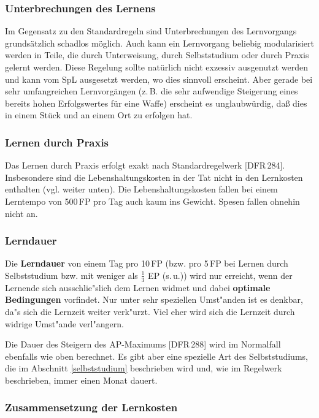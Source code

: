 \documentclass[10pt,a4paper,germanpar]{article}
\begin{document}
\subsubsection{Unterbrechungen des Lernens}

Im Gegensatz zu den Standardregeln sind Unterbrechungen des
Lernvorgangs grundsätzlich schadlos möglich. Auch kann ein Lernvorgang
beliebig modularisiert werden in Teile, die durch Unterweisung, durch
Selbststudium oder durch Praxis gelernt werden. Diese Regelung sollte
natürlich nicht exzessiv ausgenutzt werden und kann vom SpL
ausgesetzt werden, wo dies sinnvoll erscheint.  Aber gerade bei sehr
umfangreichen Lernvorgängen (z.\,B. die sehr aufwendige Steigerung
eines bereits hohen Erfolgswertes für eine Waffe) erscheint es
un\-glaub\-wür\-dig, daß dies in einem Stück und an einem Ort zu erfolgen
hat.

\subsubsection{Lernen durch Praxis}

Das Lernen durch Praxis erfolgt exakt nach Standardregelwerk
[DFR\,284]. Insbesondere sind die Lebenshaltungskosten in der Tat
nicht in den Lernkosten enthalten (vgl. weiter unten). Die
Lebenshaltungskosten fallen bei einem Lerntempo von 500\,FP pro Tag
auch kaum ins Gewicht. Spesen fallen ohnehin nicht an.

\subsubsection{Lerndauer}

Die \textbf{Lerndauer} von einem Tag pro 10\,FP (bzw. pro 5\,FP bei
Lernen durch Selbststudium bzw. mit weniger als $\frac{1}{3}$ EP
(s.\,u.)) wird nur erreicht, wenn der Lernende sich ausschlie"slich
dem Lernen widmet und dabei \textbf{optimale Bedingungen} vorfindet.
Nur unter sehr speziellen Umst"anden ist es denkbar, da"s sich die
Lernzeit weiter verk"urzt. Viel eher wird sich die Lernzeit durch
widrige Umst"ande verl"angern.

Die Dauer des Steigern des AP-Maximums [DFR\,288] wird im Normalfall ebenfalls
wie oben berechnet. Es gibt aber eine spezielle Art des Selbststudiums, die im
Abschnitt \ref{selbststudium} beschrieben wird und, wie im Regelwerk
beschrieben, immer einen Monat dauert.

\subsubsection{Zusammensetzung der Lernkosten}
\end{document}
